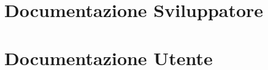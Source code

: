 \renewcommand*{\mypath}{trovaintruso2}%

\graphicspath{ {\mypath/images/} }

\section[Sviluppatore]{Documentazione Sviluppatore}


\section[Utente]{Documentazione Utente}

